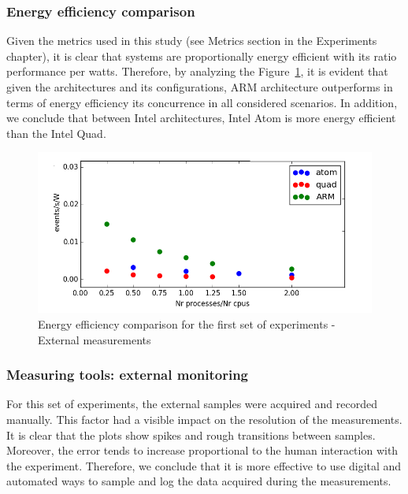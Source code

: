 \subsubsection*{Energy efficiency comparison}
Given the metrics used in this study (see Metrics section in the Experiments chapter), it is clear that  
systems are  proportionally energy efficient with its ratio performance per 
watts. Therefore, by analyzing the Figure~\ref{fig:aalto_all_results}, it is evident that given the architectures and its configurations, ARM architecture outperforms in terms of energy efficiency its concurrence in all considered 
scenarios. In addition, we conclude that between Intel architectures, Intel Atom is more energy efficient than the Intel Quad. 

\begin{figure}[h]
  \centering
    \includegraphics[width=150mm]{"img/aalto/aalto_all_results"}
    \caption{Energy efficiency comparison for the first set of experiments - External measurements}
    \label{fig:aalto_all_results}
\end{figure}

\subsubsection*{Measuring tools: external monitoring}
For this set of experiments, the external samples were acquired and recorded 
manually. This factor had a visible impact on the resolution of the measurements. It is clear that the plots show spikes and rough transitions between samples. Moreover, the error
tends to increase proportional to the human interaction with the experiment. 
Therefore, we conclude that it is more effective to use digital and automated ways to sample and
log the data acquired during the measurements.

